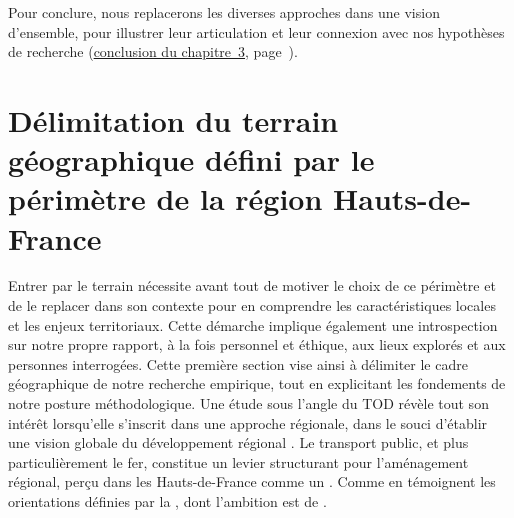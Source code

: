 \begin{refsegment}
Pour conclure, nous replacerons les diverses approches dans une vision d’ensemble, pour illustrer leur articulation et leur connexion avec nos hypothèses de recherche (\hyperref[chap3:conclusion]{conclusion du chapitre~3}, page~\pageref{chap3:conclusion}).%

    \newpage
\section{Délimitation du terrain géographique défini par le périmètre de la région Hauts-de-France
    \label{chap3:region-hauts-de-france}
    }

Entrer par le terrain nécessite avant tout de motiver le choix de ce périmètre et de le replacer dans son contexte pour en comprendre les caractéristiques locales et les enjeux territoriaux. Cette démarche implique également une introspection sur notre propre rapport, à la fois personnel et éthique, aux lieux explorés et aux personnes interrogées. Cette première section vise ainsi à délimiter le cadre géographique de notre recherche empirique, tout en explicitant les fondements de notre posture méthodologique. Une étude sous l'angle du \acrshort{TOD} révèle tout son intérêt lorsqu’elle s’inscrit dans une approche régionale, dans le souci d'établir une vision globale du développement régional \textcolor{blue}{\autocite[24]{lo_feudo_scenario_2014}}. Le transport public, et plus particulièrement le fer, constitue un levier structurant pour l'aménagement régional, perçu dans les Hauts-de-France comme un  \textcolor{blue}{\autocite[147, 163]{baron_reseaux_2017}}. Comme en témoignent les orientations définies par la \textcolor{blue}{\textcite[17]{region_hauts-de-france_planification_2024}}, dont l'ambition est de .%


\end{refsegment}
